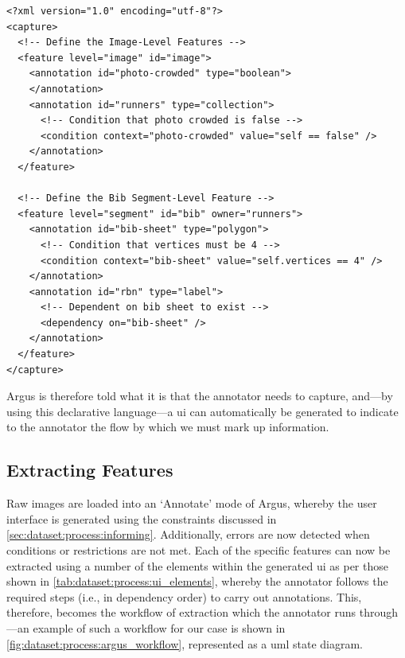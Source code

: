 \begin{lstlisting}[language=ACL, label=lst:dataset:process:acl_sample, caption={[Sample Argus Constraint Language File Format] An \glsx{acl} file describing the image-level and $BibSheet$ segment-level features as represented in an \glsac{xml} schema.}]
<?xml version="1.0" encoding="utf-8"?>
<capture>
  <!-- Define the Image-Level Features -->
  <feature level="image" id="image">
    <annotation id="photo-crowded" type="boolean">
    </annotation>
    <annotation id="runners" type="collection">
      <!-- Condition that photo crowded is false -->
      <condition context="photo-crowded" value="self == false" />
    </annotation>
  </feature>
  
  <!-- Define the Bib Segment-Level Feature -->
  <feature level="segment" id="bib" owner="runners">
    <annotation id="bib-sheet" type="polygon">
      <!-- Condition that vertices must be 4 -->
      <condition context="bib-sheet" value="self.vertices == 4" />
    </annotation>
    <annotation id="rbn" type="label">
      <!-- Dependent on bib sheet to exist -->
      <dependency on="bib-sheet" />
    </annotation>
  </feature>
</capture>
\end{lstlisting}

Argus is therefore told what it is that the annotator needs to capture, and---by using this declarative language---a \gls{ui} can automatically be generated to indicate to the annotator the flow by which we must mark up information. 

\subsection{Extracting Features}
\label{sec:dataset:process:extracting}

Raw images are loaded into an `Annotate' mode of Argus, whereby the user interface is generated using the constraints discussed in \cref{sec:dataset:process:informing}. Additionally, errors are now detected when conditions or restrictions are not met. Each of the specific features can now be extracted using a number of the elements within the generated \gls{ui} as per those shown in \cref{tab:dataset:process:ui_elements}, whereby the annotator follows the required steps (i.e., in dependency order) to carry out annotations. This, therefore, becomes the workflow of extraction which the annotator runs through---an example of such a workflow for our case is shown in \cref{fig:dataset:process:argus_workflow}, represented as a \gls{uml} state diagram.

